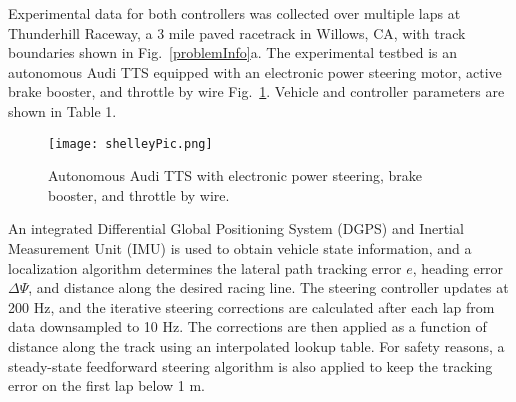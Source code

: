 \documentclass[letterpaper, 10 pt, conference]{ieeeconf}  %
\begin{document}
Experimental data for both controllers was collected over multiple laps at Thunderhill Raceway, a 3 mile paved racetrack in Willows, CA, with track boundaries shown in Fig.~\ref{problemInfo}a. The experimental testbed is an autonomous Audi TTS
equipped with an electronic power steering motor, active brake booster, and throttle by wire Fig.~\ref{fig:shelleyPic}. Vehicle
and controller parameters are shown in Table 1. 

\begin{figure}
\centering
\texttt{[image: shelleyPic.png]}
\caption{Autonomous Audi TTS with electronic power steering, brake booster, and throttle by wire.}
\label{fig:shelleyPic}
\end{figure}

An integrated Differential Global Positioning System (DGPS) and Inertial Measurement Unit (IMU) is used to obtain vehicle state information, and a localization algorithm 
determines the lateral path tracking error $e$, heading error $\Delta\Psi$, and distance along the desired racing line. The steering controller updates at 200 Hz, 
and the iterative steering corrections are calculated after each lap from data downsampled to 10 Hz. The corrections are then applied as a function of distance along the track using an
interpolated lookup table. For safety reasons, a steady-state feedforward steering algorithm \cite{kapania} is also applied to keep the tracking error on the first lap below 1 m. 
\end{document}

